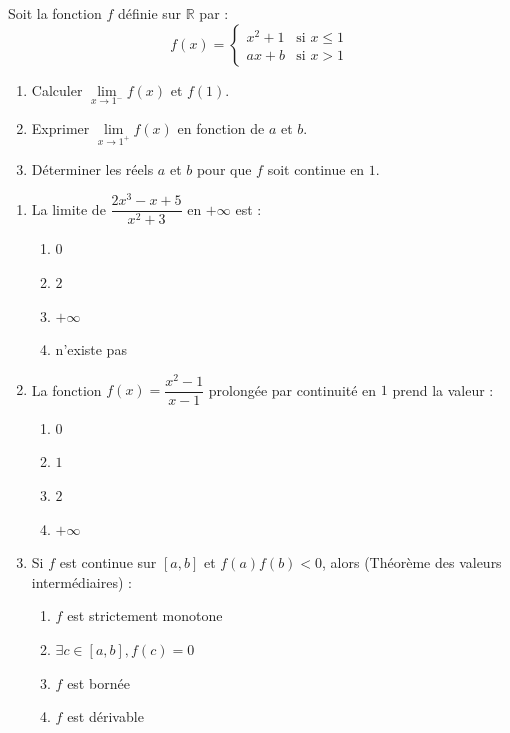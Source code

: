 \documentclass[11pt]{article}
\begin{document}
\begin{exercice}
Soit la fonction $f$ définie sur $\mathbb{R}$ par :
\[
f(x) = \begin{cases}
x^2+1 & \text{si } x \leq 1 \\
ax+b & \text{si } x > 1
\end{cases}
\]
\begin{enumerate}
    \item Calculer $\lim\limits_{x\to 1^-} f(x)$ et $f(1)$.
    \item Exprimer $\lim\limits_{x\to 1^+} f(x)$ en fonction de $a$ et $b$.
    \item Déterminer les réels $a$ et $b$ pour que $f$ soit continue en $1$.
\end{enumerate}
\end{exercice}

\begin{exercice}
\begin{enumerate}
    \item La limite de $\dfrac{2x^3-x+5}{x^2+3}$ en $+\infty$ est :
    \begin{enumerate}
        \item $0$ \item $2$ \item $+\infty$ \item n'existe pas
    \end{enumerate}
    \item La fonction $f(x)=\dfrac{x^2-1}{x-1}$ prolongée par continuité en $1$ prend la valeur :
    \begin{enumerate}
        \item $0$ \item $1$ \item $2$ \item $+\infty$
    \end{enumerate}
    \item Si $f$ est continue sur $[a,b]$ et $f(a)f(b)<0$, alors (Théorème des valeurs intermédiaires) :
    \begin{enumerate}
        \item $f$ est strictement monotone \item $\exists c\in[a,b], f(c)=0$ \item $f$ est bornée \item $f$ est dérivable
    \end{enumerate}
\end{enumerate}
\end{exercice}
\end{document}
